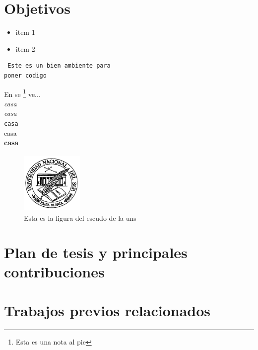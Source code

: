 %



\section{Objetivos}

\begin{itemize}
 \item item 1
 \item item 2
\end{itemize}


\begin{verbatim}
 Este es un bien ambiente para 
poner codigo
\end{verbatim}



En \cite{Davis:1989} se \footnote{Esta es una nota al pie} ve...
\\
\textit{casa} \\
\emph{casa} \\
\texttt{casa} \\
\textsf{casa} \\
\textbf{casa} \\

\begin{center}
\begin{figure}

\includegraphics[width=3cm,height=3cm]{uni.bmp}

\caption{Esta es la figura del escudo de la uns}
\end{figure}
\end{center}

\section{Plan de tesis y principales contribuciones}\label{secContribuciones}

\section{Trabajos previos relacionados}

